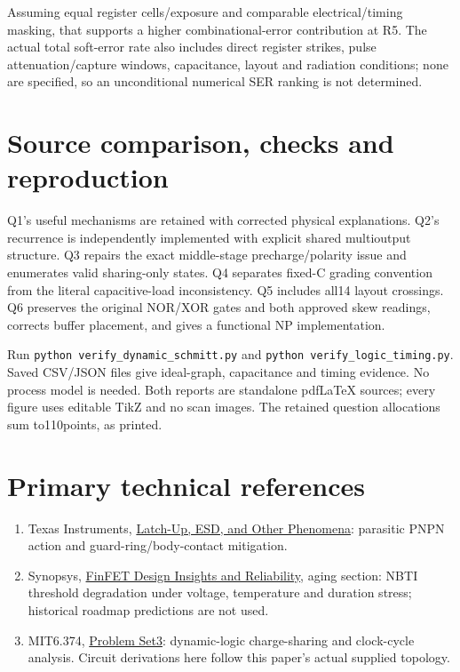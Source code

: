 \documentclass[10pt]{article}
\begin{document}
Assuming equal register cells/exposure and comparable electrical/timing masking, that supports a higher combinational-error contribution at R5. The actual total soft-error rate also includes direct register strikes, pulse attenuation/capture windows, capacitance, layout and radiation conditions; none are specified, so an unconditional numerical SER ranking is not determined.

\section*{Source comparison, checks and reproduction}
Q1's useful mechanisms are retained with corrected physical explanations. Q2's recurrence is independently implemented with explicit shared multioutput structure. Q3 repairs the exact middle-stage precharge/polarity issue and enumerates valid sharing-only states. Q4 separates fixed-C grading convention from the literal capacitive-load inconsistency. Q5 includes all14 layout crossings. Q6 preserves the original NOR/XOR gates and both approved skew readings, corrects buffer placement, and gives a functional NP implementation.

Run \texttt{python verify\_dynamic\_schmitt.py} and \texttt{python verify\_logic\_timing.py}. Saved CSV/JSON files give ideal-graph, capacitance and timing evidence. No process model is needed. Both reports are standalone pdfLaTeX sources; every figure uses editable TikZ and no scan images. The retained question allocations sum to110points, as printed.

\section*{Primary technical references}
\begin{enumerate}[leftmargin=7mm,itemsep=4pt]
\item Texas Instruments, \href{https://www.ti.com/lit/pdf/slya014}{Latch-Up, ESD, and Other Phenomena}: parasitic PNPN action and guard-ring/body-contact mitigation.
\item Synopsys, \href{https://www.synopsys.com/articles/finfet-design.html}{FinFET Design Insights and Reliability}, aging section: NBTI threshold degradation under voltage, temperature and duration stress; historical roadmap predictions are not used.
\item MIT6.374, \href{https://ocw.mit.edu/courses/6-374-analysis-and-design-of-digital-integrated-circuits-fall-2003/b4b0ba298ce3c93e19f24215304850c5_ps3_03.pdf}{Problem Set3}: dynamic-logic charge-sharing and clock-cycle analysis. Circuit derivations here follow this paper's actual supplied topology.
\end{enumerate}
\end{document}

